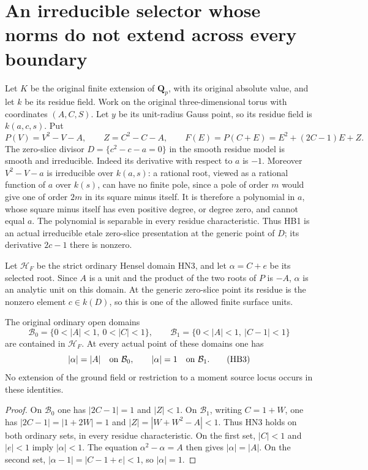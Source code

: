 \section{An irreducible selector whose norms do not extend across every boundary}
\label{sec:r13-hensel-boundary-nonextension}

Let \(K\) be the original finite extension of \(\mathbf Q_p\),
with its original absolute value, and let \(k\) be its residue
field.  Work on the original three-dimensional torus with
coordinates \((A,C,S)\).  Let \(y\) be its unit-radius Gauss
point, so its residue field is \(k(a,c,s)\).  Put
\[
 P(V)=V^2-V-A,\qquad Z=C^2-C-A,
 \qquad F(E)=P(C+E)
       =E^2+(2C-1)E+Z.
\tag{HB1}
\]
The zero-slice divisor \(D=\{c^2-c-a=0\}\) in the smooth
residue model is smooth and irreducible.  Indeed its derivative
with respect to \(a\) is \(-1\).  Moreover \(V^2-V-a\) is
irreducible over \(k(a,s)\): a rational root, viewed as a
rational function of \(a\) over \(k(s)\), can have no finite
pole, since a pole of order \(m\) would give one of order
\(2m\) in its square minus itself.  It is therefore a
polynomial in \(a\), whose square minus itself has even
positive degree, or degree zero, and cannot equal \(a\).
The polynomial is separable in every residue characteristic.
Thus HB1 is an actual irreducible etale zero-slice presentation
at the generic point of \(D\); its derivative \(2c-1\) there
is nonzero.

Let \(\mathcal H_F\) be the strict ordinary Hensel domain
HN3, and let
\(\alpha=C+e\) be its selected root.  Since \(A\) is a
unit and the product of the two roots of \(P\) is \(-A\),
\(\alpha\) is an analytic unit on this domain.  At the
generic zero-slice point its residue is the nonzero element
\(c\in k(D)\), so this is one of the allowed finite
surface units.

\begin{proposition}
\label{prop:r13-hensel-two-ordinary-branches}
The original ordinary open domains
\[
 \mathcal B_0=\{0<|A|<1,\ 0<|C|<1\},\qquad
 \mathcal B_1=\{0<|A|<1,\ |C-1|<1\}
\tag{HB2}
\]
are contained in \(\mathcal H_F\).  At every actual point
of these domains one has
\[
             |\alpha|=|A|\quad\hbox{on }\mathcal B_0,
       \qquad |\alpha|=1\quad\hbox{on }\mathcal B_1.
\tag{HB3}
\]
No extension of the ground field or restriction to a moment
source locus occurs in these identities.
\end{proposition}

\begin{proof}
On \(\mathcal B_0\) one has \(|2C-1|=1\) and
\(|Z|<1\).  On \(\mathcal B_1\), writing \(C=1+W\),
one has \(|2C-1|=|1+2W|=1\) and
\(|Z|=|W+W^2-A|<1\).  Thus HN3 holds on both ordinary
sets, in every residue characteristic.  On the first set,
\(|C|<1\) and \(|e|<1\) imply \(|\alpha|<1\).
The equation \(\alpha^2-\alpha=A\) then gives
\(|\alpha|=|A|\).  On the second set,
\(|\alpha-1|=|C-1+e|<1\), so \(|\alpha|=1\).
\end{proof}

